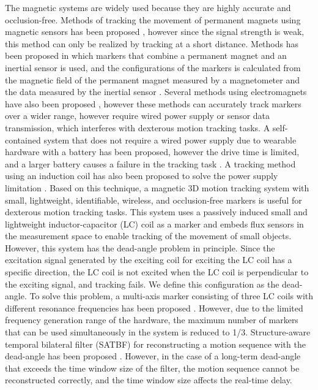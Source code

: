 \documentclass[journal,twoside,web]{ieeecolor}
\begin{document}
The magnetic systems are widely used because they are highly accurate and occlusion-free. Methods of tracking the movement of permanent magnets using magnetic sensors has been proposed \cite{gaussbits, gaussrfid, utrack}, however since the signal strength is weak, this method can only be realized by tracking at a short distance. Methods has been proposed in which markers that combine a permanent magnet and an inertial sensor is used, and the configurations of the markers is calculated from the magnetic field of the permanent magnet measured by a magnetometer and the data measured by the inertial sensor \cite{fem, magne_inert}. Several methods using electromagnets have also been proposed \cite{polhemus, intr_cap_magne_sens, finexus}, however these methods can accurately track markers over a wider range, however require wired power supply or sensor data transmission, which interferes with dexterous motion tracking tasks. A self-contained system that does not require a wired power supply due to wearable hardware with a battery has been proposed, however the drive time is limited, and a larger battery causes a failure in the tracking task \cite{auraring}.
A tracking method using an induction coil has also been proposed to solve the power supply limitation \cite {paperio}. Based on this technique, a magnetic 3D motion tracking system \cite{im3d, im6d, yabukami1, hashi1} with small, lightweight, identifiable, wireless, and occlusion-free markers is useful for dexterous motion tracking tasks. This system uses a passively induced small and lightweight inductor-capacitor (LC) coil as a marker and embeds flux sensors in the measurement space to enable tracking of the movement of small objects. However, this system has the dead-angle problem in principle. Since the excitation signal generated by the exciting coil for exciting the LC coil has a specific direction, the LC coil is not excited when the LC coil is perpendicular to the exciting signal, and tracking fails. We define this configuration as the dead-angle. To solve this problem, a multi-axis marker consisting of three LC coils with different resonance frequencies has been proposed \cite{im6d}. However, due to the limited frequency generation range of the hardware, the maximum number of markers that can be used simultaneously in the system is reduced to 1/3. Structure-aware temporal bilateral filter (SATBF) for reconstructing a motion sequence with the dead-angle has been proposed \cite{im3d+}. However, in the case of a long-term dead-angle that exceeds the time window size of the filter, the motion sequence cannot be reconstructed correctly, and the time window size affects the real-time delay.
\end{document}

